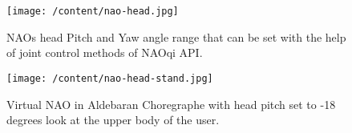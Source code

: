 \begin{figure}	 	
	\begin{minipage}
		{.6
		\textwidth}  	
		\texttt{[image: /content/nao-head.jpg]} \caption{NAOs head Pitch and Yaw angle range that can be set with the help of joint control methods of NAOqi API. \cite{8} } \label{fg:nao:head} 
	\end{minipage}
	\hspace{10 mm}
	\begin{minipage}
		{.3
		\textwidth}  
		\centering
		\texttt{[image: /content/nao-head-stand.jpg]} \caption{Virtual NAO in Aldebaran Choregraphe with head pitch set to -18 degrees look at the upper body of the user.} \label{fg:nao:head:stand} 
	\end{minipage}	
\end{figure}


